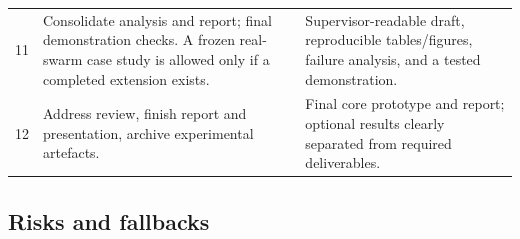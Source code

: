 \documentclass[a4paper,11pt]{article}
\begin{document}
\begin{small}
\begin{longtable}{P{1.0cm}P{7.2cm}P{7.7cm}}
11 & Consolidate analysis and report; final demonstration checks. A frozen real-swarm case study is allowed only if a completed extension exists. & Supervisor-readable draft, reproducible tables/figures, failure analysis, and a tested demonstration.\\
12 & Address review, finish report and presentation, archive experimental artefacts. & Final core prototype and report; optional results clearly separated from required deliverables.\\
\bottomrule
\end{longtable}
\end{small}

\subsection{Risks and fallbacks}
\end{document}
